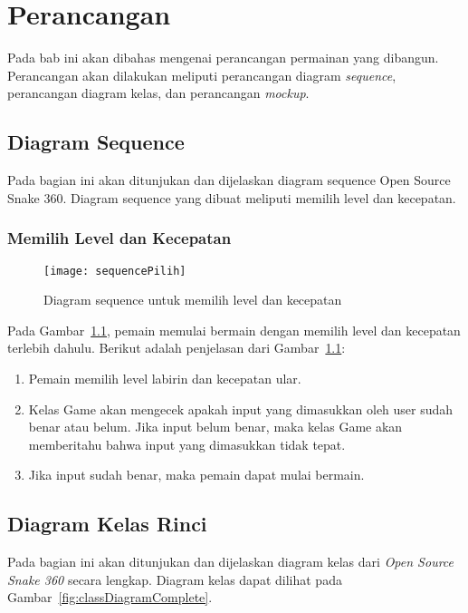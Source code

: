 \chapter{Perancangan}
\label{chap:perancangan}

Pada bab ini akan dibahas mengenai perancangan permainan yang dibangun. Perancangan akan dilakukan meliputi perancangan diagram \textit{sequence}, perancangan diagram kelas, dan perancangan \textit{mockup}.

\section{Diagram Sequence}
Pada bagian ini akan ditunjukan dan dijelaskan diagram sequence Open Source Snake 360. Diagram sequence yang dibuat  meliputi memilih level dan kecepatan. 

\subsection{Memilih Level dan Kecepatan}
\begin{figure}[H]
	\centering  
	\texttt{[image: sequencePilih]}  
	\caption[Diagram sequence untuk memilih level dan kecepatan]{Diagram sequence untuk memilih level dan kecepatan}
	\label{fig:sequencePilih} 
\end{figure}

Pada Gambar~\ref{fig:sequencePilih}, pemain memulai bermain dengan memilih level dan kecepatan terlebih dahulu. Berikut adalah penjelasan dari Gambar~\ref{fig:sequencePilih}:

\begin{enumerate}
	\item Pemain memilih level labirin dan kecepatan ular. 
	\item Kelas Game akan mengecek apakah input yang dimasukkan oleh user sudah benar atau belum. Jika input belum benar, maka kelas Game akan memberitahu bahwa input yang dimasukkan tidak tepat.
	\item Jika input sudah benar, maka pemain dapat mulai bermain.
\end{enumerate}

\section{Diagram Kelas Rinci}
Pada bagian ini akan ditunjukan dan dijelaskan diagram kelas dari \textit{Open Source Snake 360} secara lengkap. Diagram kelas dapat dilihat pada Gambar~\ref{fig:classDiagramComplete}.

